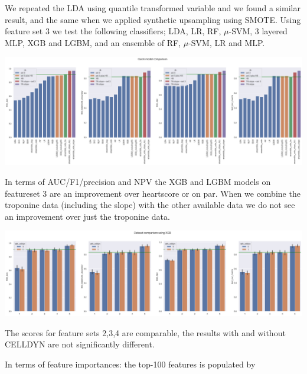 \documentclass[a4paper,10pt]{article}
\begin{document}
%
We repeated the LDA using quantile transformed variable and we found a similar result, and the same 
when we applied synthetic upsampling using SMOTE.
%
Using feature set 3 we test the following classifiers; LDA, LR, RF, $\mu$-SVM, $3$ layered MLP, XGB and LGBM, and an ensemble of RF, $\mu$-SVM, LR and MLP. 
%
\begin{center}
 \includegraphics[bb=0 0 1615 587,scale=0.2,keepaspectratio=true]{images/perf_bar.png}
\end{center}

In terms of AUC/F1/precision and NPV the XGB and LGBM models on featureset 3 are an improvement over heartscore or on par. When we combine the troponine data (including the slope) with the other available data we do not see an improvement over just the troponine data. 
%
\begin{center}
 \includegraphics[bb=0 0 1615 464,scale=0.2,keepaspectratio=true]{images/perf_bar_ds.png}
\end{center}
%
The scores for feature sets 2,3,4 are comparable, the results with and without CELLDYN 
are not significantly different.

%
In terms of feature importances: the top-100 features is populated by 
%
%
\end{document}
